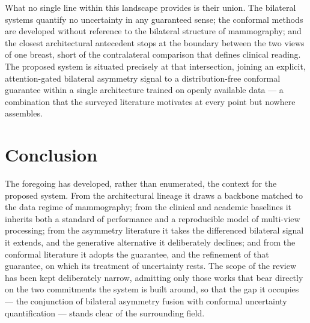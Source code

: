 \documentclass[12pt, a4paper]{article}
\begin{document}
What no single line within this landscape provides is their union. The
bilateral systems quantify no uncertainty in any guaranteed sense; the
conformal methods are developed without reference to the bilateral structure
of mammography; and the closest architectural antecedent stops at the
boundary between the two views of one breast, short of the contralateral
comparison that defines clinical reading. The proposed system is situated
precisely at that intersection, joining an explicit, attention-gated
bilateral asymmetry signal to a distribution-free conformal guarantee within
a single architecture trained on openly available data --- a combination
that the surveyed literature motivates at every point but nowhere assembles.

\section{Conclusion}

The foregoing has developed, rather than enumerated, the context for the
proposed system. From the architectural lineage it draws a backbone matched
to the data regime of mammography; from the clinical and academic baselines
it inherits both a standard of performance and a reproducible model of
multi-view processing; from the asymmetry literature it takes the differenced
bilateral signal it extends, and the generative alternative it deliberately
declines; and from the conformal literature it adopts the guarantee, and the
refinement of that guarantee, on which its treatment of uncertainty rests.
The scope of the review has been kept deliberately narrow, admitting only
those works that bear directly on the two commitments the system is built
around, so that the gap it occupies --- the conjunction of bilateral
asymmetry fusion with conformal uncertainty quantification --- stands clear
of the surrounding field.

\newpage
\printbibliography[title={References}]
\end{document}
